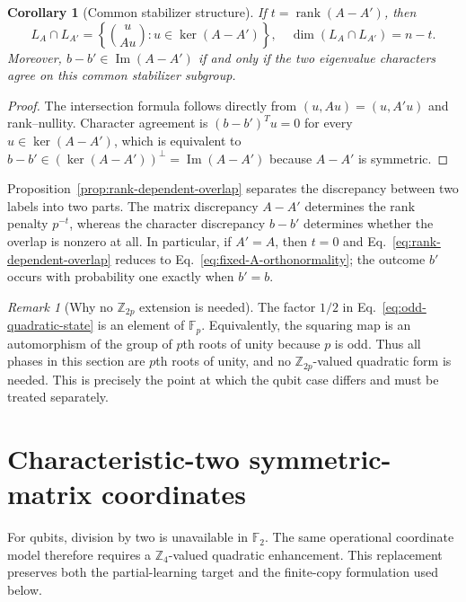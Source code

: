 \documentclass[11pt]{article}
\newcommand{\F}{\mathbb F}
\newcommand{\rank}{\operatorname{rank}}
\newcommand{\im}{\operatorname{Im}}
\newcommand{\1}{\mathbf 1}
\theoremstyle{plain}
\newtheorem{corollary}[theorem]{Corollary}
\theoremstyle{definition}
\theoremstyle{remark}
\newtheorem{remark}[theorem]{Remark}
\begin{document}
\begin{corollary}[Common stabilizer structure]
\label{cor:common-stabilizer-structure}
If $t=\rank(A-A')$, then
\begin{equation}
 L_A\cap L_{A'}=\left\{\binom{u}{Au}:u\in\ker(A-A')\right\},
 \quad \dim(L_A\cap L_{A'})=n-t.
 \label{eq:common-lagrangian-intersection}
\end{equation}
Moreover, $b-b'\in\im(A-A')$ if and only if the two eigenvalue characters
agree on this common stabilizer subgroup.
\end{corollary}

\begin{proof}
The intersection formula follows directly from $(u,Au)=(u,A'u)$ and
rank--nullity. Character agreement is $(b-b')^Tu=0$ for every
$u\in\ker(A-A')$, which is equivalent to
$b-b'\in(\ker(A-A'))^\perp=\im(A-A')$ because $A-A'$ is symmetric.
\end{proof}

Proposition~\ref{prop:rank-dependent-overlap} separates the discrepancy
between two labels into two parts.  The matrix discrepancy $A-A'$ determines
the rank penalty $p^{-t}$, whereas the character discrepancy $b-b'$ determines
whether the overlap is nonzero at all.  In particular, if $A'=A$, then
$t=0$ and Eq.~\eqref{eq:rank-dependent-overlap} reduces to
Eq.~\eqref{eq:fixed-A-orthonormality}; the outcome $b'$ occurs with
probability one exactly when $b'=b$.

\begin{remark}[Why no \texorpdfstring{$\mathbb Z_{2p}$}{Z2p} extension is needed]
\label{rem:no-Z2p}
The factor $1/2$ in Eq.~\eqref{eq:odd-quadratic-state} is an element of
$\F_p$.  Equivalently, the squaring map is an automorphism of the group of
$p$th roots of unity because $p$ is odd.  Thus all phases in this section are
$p$th roots of unity, and no $\mathbb Z_{2p}$-valued quadratic form is needed.
This is precisely the point at which the qubit case differs and must be treated
separately.
\end{remark}





\section{Characteristic-two symmetric-matrix coordinates}
\label{sec:integrated-qubit-foundations}

For qubits, division by two is unavailable in $\F_2$.  The same operational coordinate model therefore requires a $\mathbb Z_4$-valued quadratic enhancement.  This replacement preserves both the partial-learning target and the finite-copy formulation used below.
\end{document}
